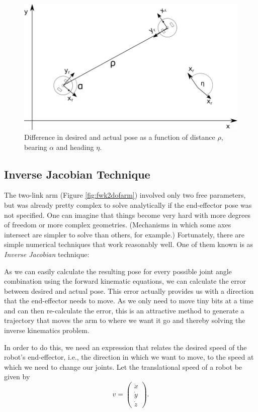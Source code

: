 \begin{figure}
	\centering
		\includegraphics[width=\textwidth]{figs/trajectorygen}
	\caption{Difference in desired and actual pose as a function of distance $\rho$, bearing $\alpha$ and heading $\eta$. 
	\label{fig:trajectorygen}}
\end{figure}


\subsection{Inverse Jacobian Technique
}\label{sec:invjac}
The two-link arm (Figure \ref{fig:fwk2dofarm}) involved only two free parameters, but was already pretty complex to solve analytically if the end-effector pose was not specified. One can imagine that things become very hard with more degrees of freedom or more complex geometries. (Mechanisms in which some axes intersect are simpler to solve than others, for example.) Fortunately, there are simple numerical techniques that work reasonably well. One of them known is as \emph{Inverse Jacobian} technique:

As we can easily calculate the resulting pose for every possible joint angle combination using the forward kinematic equations, we can calculate the error between desired and actual pose. This error actually provides us with a direction that the end-effector needs to move. As we only need to move tiny bits at a time and can then re-calculate the error, this is an attractive method to generate a trajectory that moves the arm to where we want it go and thereby solving the inverse kinematics problem.

In order to do this, we need an expression that relates the desired speed of the robot's end-effector, i.e., the direction in which we want to move, to the speed at which we need to change our joints. Let the translational speed of a robot be given by 
\begin{equation}
v=\left(\begin{array}{c}
\dot{x}\\
\dot{y}\\
\dot{z}
\end{array}
\right).
\end{equation}


